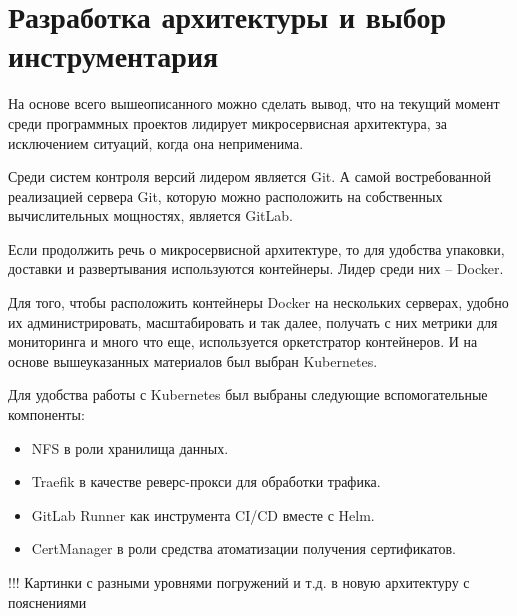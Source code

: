 \section{Разработка архитектуры и выбор инструментария}
\label{sec:tools}

На основе всего вышеописанного можно сделать вывод, что на текущий момент среди программных проектов лидирует микросервисная архитектура, за исключением ситуаций, когда она неприменима.

Среди систем контроля версий лидером является Git. А самой востребованной реализацией сервера Git, которую можно расположить на собственных вычислительных мощностях, является GitLab.

Если продолжить речь о микросервисной архитектуре, то для удобства упаковки, доставки и развертывания используются контейнеры. Лидер среди них -- Docker.

Для того, чтобы расположить контейнеры Docker на нескольких серверах, удобно их администрировать, масштабировать и так далее, получать с них метрики для мониторинга и много что еще, используется оркетстратор контейнеров. И на основе вышеуказанных материалов был выбран Kubernetes.

Для удобства работы с Kubernetes был выбраны следующие вспомогательные компоненты:
\begin{itemize}
    \item NFS в роли хранилища данных.
    \item Traefik в качестве реверс-прокси для обработки трафика.
    \item GitLab Runner как инструмента CI/CD вместе с Helm.
    \item CertManager в роли средства атоматизации получения сертификатов.
\end{itemize}

!!! Картинки с разными уровнями погружений и т.д. в новую архитектуру с пояснениями

